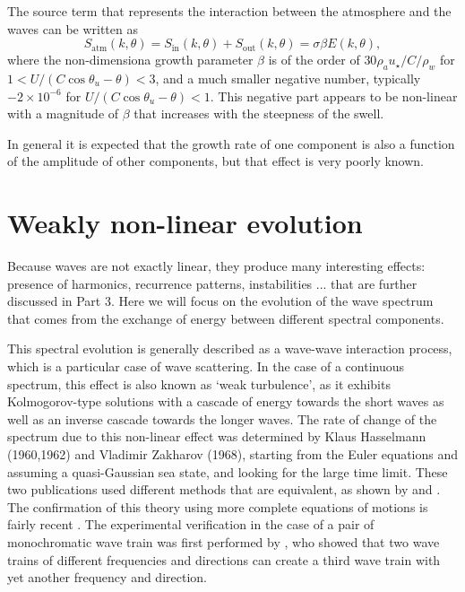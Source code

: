 The source term that represents the interaction between the atmosphere and the waves can be written as 
\begin{equation}
S_{\mathrm{atm}}(k,\theta)=S_{\mathrm{in}}(k,\theta)+S_{\mathrm{out}}(k,\theta) = \sigma \beta E(k,\theta),
\end{equation}
where the non-dimensiona growth parameter $\beta$ is of the order of $30 \rho_a u_\star / C / \rho_w$ for $1 < U/(C \cos \theta_u - \theta) < 3$, 
and a much smaller negative number, typically $-2 \times 10^{-6}$ for  $U/(C \cos \theta_u - \theta) < 1$. This negative 
part appears to be non-linear with a magnitude of $\beta$ that increases with the steepness of the swell. 

In general it is expected that the growth rate of one component is also a function of the amplitude of other components, but that effect is very poorly 
known.

\section{Weakly non-linear evolution}
Because waves are not exactly linear, 
they produce many interesting effects: presence of harmonics, recurrence patterns, instabilities ... that are further discussed in Part 3. Here we will focus on the evolution of the wave spectrum that comes from the exchange of 
energy between different spectral components. 

This spectral evolution is generally described as a wave-wave interaction process, which is a particular case of wave scattering. In the case of a continuous 
spectrum, this effect is also known as `weak turbulence', as it exhibits Kolmogorov-type solutions with a cascade of energy towards the short waves as well as an 
inverse cascade towards the longer waves. The rate of change 
of the spectrum due to this non-linear effect was determined by Klaus
Hasselmann (1960\nocite{Hasselmann1960},1962\nocite{Hasselmann1962}) and Vladimir Zakharov
(1968\nocite{Zakharov1968}), starting from the Euler equations and assuming a quasi-Gaussian sea state, and looking for the large time limit. These two publications used different methods that are equivalent, as shown by \citet[e.g.][]{Elfouhaily&al.2000} and \citet[e.g.][]{Resio&al.2001}.
The confirmation of this theory using more complete equations of motions is fairly recent \citep{Tanaka2001b,Korotkevich&al.2008}. 
The experimental verification in the case of a pair of monochromatic wave train was first performed by \cite{McGoldrick&al.1966}, who showed that two wave trains of different 
frequencies and directions can create a third wave train with yet another frequency and direction. 

